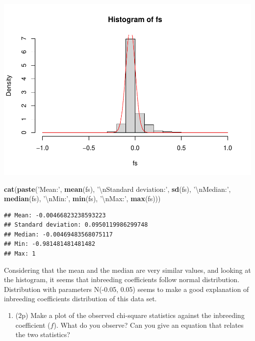\documentclass[
]{article}
\newenvironment{Shaded}{\begin{snugshade}}{\end{snugshade}}
\newcommand{\CharTok}[1]{\textcolor[rgb]{0.31,0.60,0.02}{#1}}
\newcommand{\KeywordTok}[1]{\textcolor[rgb]{0.13,0.29,0.53}{\textbf{#1}}}
\newcommand{\NormalTok}[1]{#1}
\newcommand{\StringTok}[1]{\textcolor[rgb]{0.31,0.60,0.02}{#1}}
\providecommand{\tightlist}{%
  \setlength{\itemsep}{0pt}\setlength{\parskip}{0pt}}
\begin{document}
\includegraphics{P022020_HWE_files/figure-latex/16th-1.pdf}

\begin{Shaded}
\begin{Highlighting}[]
\KeywordTok{cat}\NormalTok{(}\KeywordTok{paste}\NormalTok{(}\StringTok{'Mean:'}\NormalTok{, }\KeywordTok{mean}\NormalTok{(fs), }\StringTok{'}\CharTok{\textbackslash{}n}\StringTok{Standard deviation:'}\NormalTok{, }\KeywordTok{sd}\NormalTok{(fs), }\StringTok{'}\CharTok{\textbackslash{}n}\StringTok{Median:'}\NormalTok{, }\KeywordTok{median}\NormalTok{(fs), }\StringTok{'}\CharTok{\textbackslash{}n}\StringTok{Min:'}\NormalTok{, }\KeywordTok{min}\NormalTok{(fs), }\StringTok{'}\CharTok{\textbackslash{}n}\StringTok{Max:'}\NormalTok{, }\KeywordTok{max}\NormalTok{(fs)))}
\end{Highlighting}
\end{Shaded}

\begin{verbatim}
## Mean: -0.00466823238593223 
## Standard deviation: 0.0950119986299748 
## Median: -0.00469483568075117 
## Min: -0.981481481481482 
## Max: 1
\end{verbatim}

Considering that the mean and the median are very similar values, and
looking at the histogram, it seems that inbreeding coefficients follow
normal distribution. Distribution with parameters N(-0.05, 0.05) seems
to make a good explanation of inbreeding coefficients distribution of
this data set.

\begin{enumerate}
\def\labelenumi{\arabic{enumi}.}
\setcounter{enumi}{16}
\tightlist
\item
  (2p) Make a plot of the observed chi-square statistics against the
  inbreeding coefficient (\(\hat{f}\)). What do you observe? Can you
  give an equation that relates the two statistics?
\end{enumerate}
\end{document}

